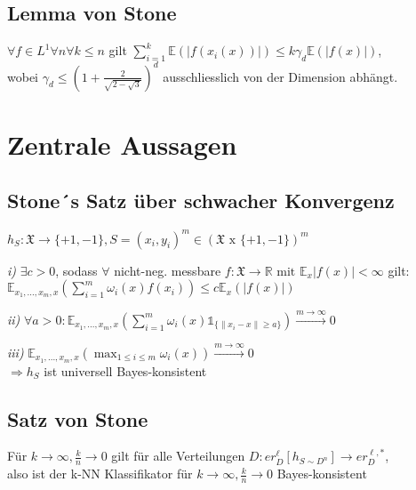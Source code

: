 \documentclass[a4paper,oneside,DIV8,10pt]{scrartcl}
\begin{document}
\subsection{Lemma von Stone}
$\forall f \in L^{1} \forall n \forall k \leq n$ gilt $\sum^{k}_{i=1} \mathbb{E} (|f(x_{i} (x))|) \leq k \gamma_{d} \mathbb{E} (|f(x)|)$,
\\ wobei $\gamma_d \leq (1 + \frac{2}{\sqrt{2 - \sqrt{3}}})^{d}$ ausschliesslich von der Dimension abh\"angt.

\section{Zentrale Aussagen}

\subsection{Stone´s Satz \"uber schwacher Konvergenz}
$h_{S}: \mathfrak{X} \to \{+1,-1\}, S =(x_{i}, y_{i})^{m} \in (\mathfrak{X} \text{ x }\{+1, -1\})^{m}$

\emph{i)} $\exists c > 0$, sodass $\forall$ nicht-neg. messbare $f: \mathfrak{X} \to \mathbb{R} \text{ mit } \mathbb{E}_x |f(x)| < \infty$ gilt:
	\\ $\mathbb{E}_{x_{1},...,x_{m},x} (\sum^{m}_{i=1} \omega_{i}(x)f(x_{i})) \leq c \mathbb{E}_{x}(|f(x)|)$

\emph{ii)} $ \forall a > 0: \mathbb{E}_{x_{1},...,x_{m},x} (\sum^{m}_{i=1} \omega_{i}(x) \mathds{1}_{\{\|x_{i} - x\| \geq a\}}) \stackrel{m \to \infty}{\longrightarrow} 0 $

\emph{iii)} $\mathbb{E}_{x_{1},...,x_{m},x} (\max_{1 \leq i \leq m} \omega_{i}(x)) \stackrel{m \to \infty}{\longrightarrow} 0$
\\ $\Rightarrow h_{S}$ ist universell Bayes-konsistent

\subsection{Satz von Stone}
F\"ur $k \rightarrow \infty, \frac{k}{n} \rightarrow 0$ gilt f\"ur alle Verteilungen $D: er^{\ell}_{D}[h_{S \sim D^{n}}] \rightarrow er^{\ell,*}_{D}$, 
\\ also ist der k-NN Klassifikator f\"ur $k \rightarrow \infty, \frac{k}{n} \rightarrow 0$ Bayes-konsistent
\end{document}
